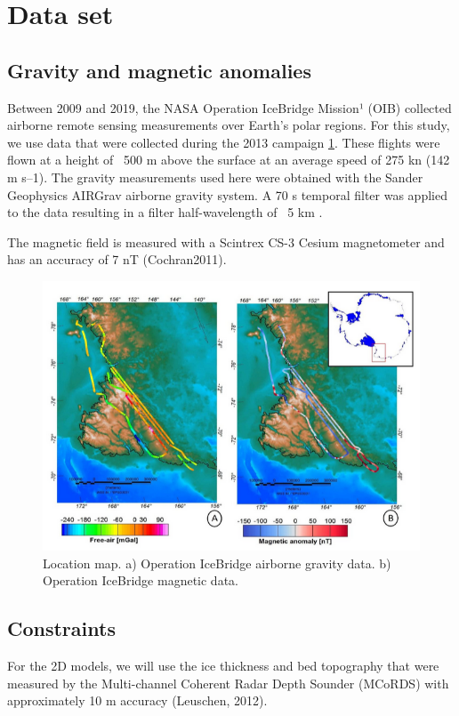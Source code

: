 \documentclass{article}
\begin{document}
\section{Data set}
\label{sec:dataset}
	\subsection{Gravity and magnetic anomalies}
	\label{ssec:dataset_gravmag}
	Between 2009 and 2019, the NASA Operation IceBridge Mission¹ (OIB) collected airborne remote 
	sensing measurements over Earth’s polar regions. For this study, we use data that were collected 
	during the 2013 campaign \ref{fig:flightdata}. These flights were flown at a height of ~500 m above the surface 
	at an average speed of 275 kn (142 m s–1). The gravity measurements used here were obtained with the 
	Sander Geophysics AIRGrav airborne gravity system. A 70 s temporal filter was applied to the data 
	resulting in a filter half-wavelength of ~5 km \citep{Cochran2012}. 
	
	The magnetic field is measured with a Scintrex CS-3 Cesium magnetometer and has an accuracy of 7 nT 
	(Cochran2011).

\begin{figure}[!htb] %
	\centering
	\includegraphics[width=0.5\columnwidth]{../figures/flightdata}
	\caption{
		Location map.
		a) Operation IceBridge airborne gravity data. 
		b) Operation IceBridge magnetic data.
	}
\label{fig:flightdata}
\end{figure} 

	\subsection{Constraints}
	\label{ssec:dataset_constraints}
	For the 2D models, we will use the ice thickness and bed topography that were 
	measured by the Multi-channel Coherent Radar Depth Sounder (MCoRDS) with 
	approximately 10 m accuracy (Leuschen, 2012).
	
\end{document}
